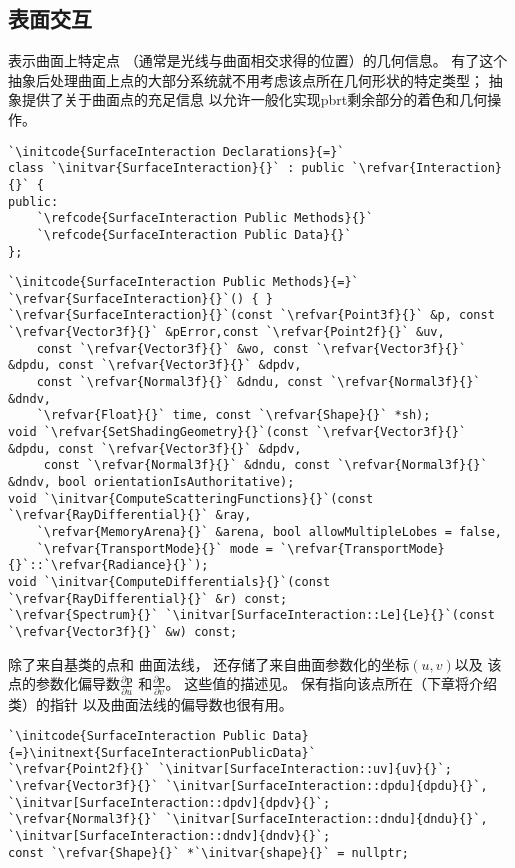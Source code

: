 \subsection{表面交互}\label{sub:表面交互}
表示曲面上特定点
（通常是光线与曲面相交求得的位置）的几何信息。
有了这个抽象后处理曲面上点的大部分系统就不用考虑该点所在几何形状的特定类型；
抽象提供了关于曲面点的充足信息
以允许一般化实现pbrt剩余部分的着色和几何操作。
\begin{lstlisting}
`\initcode{SurfaceInteraction Declarations}{=}`
class `\initvar{SurfaceInteraction}{}` : public `\refvar{Interaction}{}` {
public:
    `\refcode{SurfaceInteraction Public Methods}{}`
    `\refcode{SurfaceInteraction Public Data}{}`
};
\end{lstlisting}
\begin{lstlisting}
`\initcode{SurfaceInteraction Public Methods}{=}`
`\refvar{SurfaceInteraction}{}`() { }
`\refvar{SurfaceInteraction}{}`(const `\refvar{Point3f}{}` &p, const `\refvar{Vector3f}{}` &pError,const `\refvar{Point2f}{}` &uv,
    const `\refvar{Vector3f}{}` &wo, const `\refvar{Vector3f}{}` &dpdu, const `\refvar{Vector3f}{}` &dpdv,
    const `\refvar{Normal3f}{}` &dndu, const `\refvar{Normal3f}{}` &dndv,
    `\refvar{Float}{}` time, const `\refvar{Shape}{}` *sh);
void `\refvar{SetShadingGeometry}{}`(const `\refvar{Vector3f}{}` &dpdu, const `\refvar{Vector3f}{}` &dpdv,
     const `\refvar{Normal3f}{}` &dndu, const `\refvar{Normal3f}{}` &dndv, bool orientationIsAuthoritative);
void `\initvar{ComputeScatteringFunctions}{}`(const `\refvar{RayDifferential}{}` &ray,
    `\refvar{MemoryArena}{}` &arena, bool allowMultipleLobes = false,
    `\refvar{TransportMode}{}` mode = `\refvar{TransportMode}{}`::`\refvar{Radiance}{}`);
void `\initvar{ComputeDifferentials}{}`(const `\refvar{RayDifferential}{}` &r) const;
`\refvar{Spectrum}{}` `\initvar[SurfaceInteraction::Le]{Le}{}`(const `\refvar{Vector3f}{}` &w) const;
\end{lstlisting}

除了来自基类的点和
曲面法线，
还存储了来自曲面参数化的坐标$(u,v)$以及
该点的参数化偏导数$\displaystyle\frac{\partial \bm p}{\partial u}$
和$\displaystyle\frac{\partial \bm p}{\partial v}$。
这些值的描述见。
保有指向该点所在（下章将介绍类）的指针
以及曲面法线的偏导数也很有用。
\begin{lstlisting}
`\initcode{SurfaceInteraction Public Data}{=}\initnext{SurfaceInteractionPublicData}`
`\refvar{Point2f}{}` `\initvar[SurfaceInteraction::uv]{uv}{}`;
`\refvar{Vector3f}{}` `\initvar[SurfaceInteraction::dpdu]{dpdu}{}`, `\initvar[SurfaceInteraction::dpdv]{dpdv}{}`;
`\refvar{Normal3f}{}` `\initvar[SurfaceInteraction::dndu]{dndu}{}`, `\initvar[SurfaceInteraction::dndv]{dndv}{}`;
const `\refvar{Shape}{}` *`\initvar{shape}{}` = nullptr;
\end{lstlisting}

